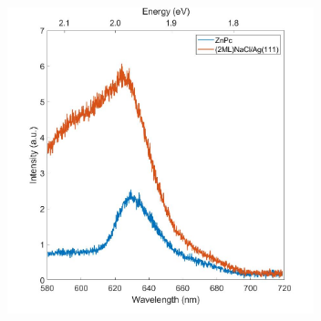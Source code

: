 






\begin{figure} [h]
    \centering
    \includegraphics[width=3.5in]{pictures/znpc_3V_300pA_300s.jpg}
    \caption{}
    \label{fig:opv:znpc-stml}
\end{figure}

